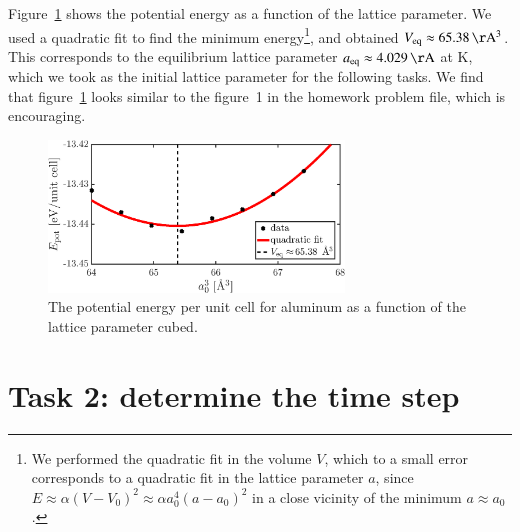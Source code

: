 Figure~\ref{fig1} shows the potential energy as a function of the lattice parameter. We used a quadratic fit to find the minimum energy\footnote{We performed the quadratic fit in the volume $V$, which to a small error corresponds to a quadratic fit in the lattice parameter $a$, since $E \approx  \alpha(V-V_0)^2 \approx \alpha a_0^4 (a-a_0)^2$ in a close vicinity of the minimum $a\approx a_0$.}, and obtained $V_{\rm eq} \approx \unit[65.38]{\AA^3}$. This corresponds to the equilibrium lattice parameter $a_{\rm eq} \approx \unit[4.029]{\AA}$ at \unit[0]{K}, which we took as the initial lattice parameter for the following tasks.  We find that figure~\ref{fig1} looks similar to the figure~1 in the homework problem file, which is encouraging.
\begin{figure}[!ht]
\begin{center}
  \includegraphics[width=0.7\textwidth]{../figures/potential_energy} 
  \caption{The potential energy per unit cell for aluminum as a function of the lattice parameter cubed.}
  \label{fig1}
\end{center}
\end{figure}

\section*{Task 2: determine the time step}


